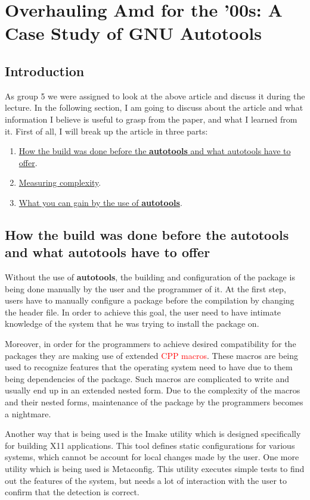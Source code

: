 \documentclass[11pt]{article}
\begin{document}
\section{Overhauling Amd for the ’00s: A Case Study of GNU Autotools}

\subsection{Introduction}

As group 5 we were assigned to look at the above article and discuss it during the lecture. In the following section, I am going to discuss about the article and what information I believe is useful to grasp from the paper, and what I learned from it. First of all, I will break up the article in three parts:
\begin{enumerate}
\item \underline{How the build was done before the \textbf{autotools} and what autotools have to offer}.
\item \underline{Measuring complexity}.
\item \underline{What you can gain by the use of \textbf{autotools}}.
\end{enumerate}

\subsection{How the build was done before the autotools and what autotools have to offer}

Without the use of \textbf{autotools}, the building and configuration of the package is being done manually by the user and the programmer of it. At the first step, users have to manually configure a package before the compilation by changing the header file. In order to achieve this goal, the user need to have intimate knowledge of the system that he was trying to install the package on.

Moreover, in order for the programmers to achieve desired compatibility for the packages they are making use of extended \textcolor{red}{CPP macros}. These macros are being used to recognize features that the operating system need to have due to them being dependencies of the package. Such macros are complicated to write and usually end up in an extended nested form. Due to the complexity of the macros and their nested forms, maintenance of the package by the programmers becomes a nightmare.

Another way that is being used is the Imake utility which is designed specifically for building X11 applications. This tool defines static configurations for various systems, which cannot be account for local changes made by the user. One more utility which is being used is Metaconfig. This utility executes simple tests to find out the features of the system, but needs a lot of interaction with the user to confirm that the detection is correct.
\end{document}
